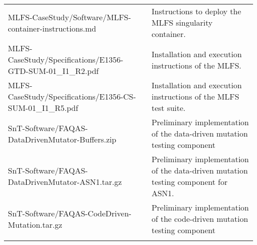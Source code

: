 \begin{longtable}{|p{9cm}|p{6cm}@{}}
MLFS-CaseStudy/Software/MLFS-container-instructions.md&Instructions to deploy the MLFS singularity container.\\
MLFS-CaseStudy/Specifications/E1356-GTD-SUM-01\_I1\_R2.pdf&Installation and execution instructions of the MLFS.\\
MLFS-CaseStudy/Specifications/E1356-CS-SUM-01\_I1\_R5.pdf&Installation and execution instructions of the MLFS test suite.\\
\hline
SnT-Software/FAQAS-DataDrivenMutator-Buffers.zip&Preliminary implementation of the data-driven mutation testing component\\
SnT-Software/FAQAS-DataDrivenMutator-ASN1.tar.gz&Preliminary implementation of the data-driven mutation testing component for ASN1.\\
SnT-Software/FAQAS-CodeDriven-Mutation.tar.gz&Preliminary implementation of the code-driven mutation testing component\\
\\
\hline


                                                    
\end{longtable}
\normalsize

\clearpage